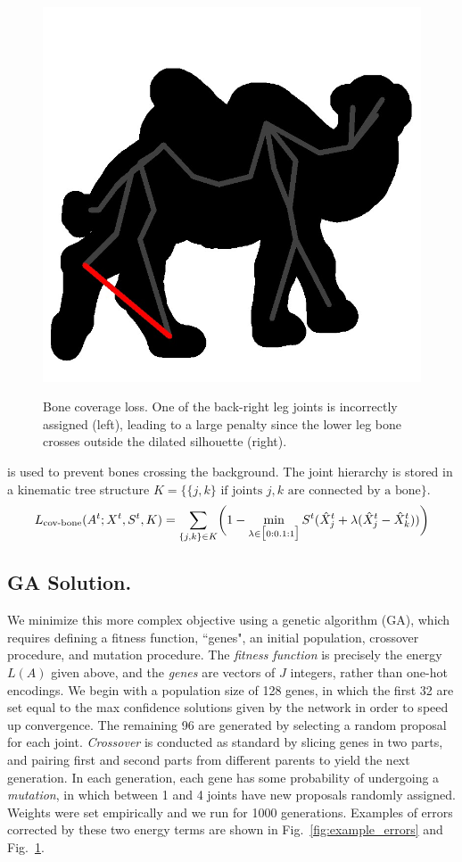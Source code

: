 \begin{figure}[t!]
\begin{floatrow}
{{    \includegraphics[trim={0cm 0cm 0cm 0cm},clip,width=0.45\linewidth]{bone_coverage/bone_error_overlay_cropped.jpg}
    }
}
{\caption{Bone coverage loss. One of the back-right leg joints is incorrectly assigned (left), leading to a large penalty since the lower leg bone crosses outside the dilated silhouette (right).}
\label{fig:cov-bone}
}
\end{floatrow}
\end{figure}

 is used to prevent bones crossing the background. The joint hierarchy is stored in a kinematic tree structure $K = \{\{j,k\} \text{ if joints } j, k \text{ are connected by a bone}\}$.
\begin{equation}
L_{\textrm{cov-bone}}(A^{t};X^{t},S^{t},K) = \sum_{\{j,k\} \in K}\biggl(1 - \min_{\lambda \in \big[0:0.1:1\big]}S^{t}(\hat{X}_{j}^{t} + \lambda(\hat{X}_{j}^{t} - \hat{X}_{k}^{t}))\biggr)
\end{equation}

\begin{figure}[t!]
    
\end{figure}

\subsection{GA Solution.}
We minimize this more complex objective using a genetic algorithm (GA)\cite{holland1992adaptation}, which requires defining a fitness function, ``genes", an initial population, crossover procedure, and mutation procedure. 
The {\em fitness function} is precisely the energy $L(A)$ given above, and the {\em genes} are vectors of $J$ integers, rather than one-hot encodings.
We begin with a population size of 128 genes, in which the first 32 are set equal to the max confidence solutions given by the network in order to speed up convergence. The remaining 96 are generated by selecting a random proposal for each joint. {\em Crossover} is conducted as standard by slicing genes in two parts, and pairing first and second parts from different parents to yield the next generation. In each generation, each gene has some probability of undergoing a {\em mutation}, in which between 1 and 4 joints have new proposals randomly assigned. Weights were set empirically and we run for 1000 generations.
Examples of errors corrected by these two energy terms are shown in Fig.~\ref{fig:example_errors} and Fig.~\ref{fig:cov-bone}.


